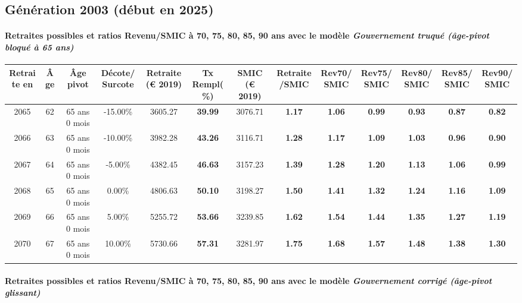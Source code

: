 \newpage 
 
\subsection{Génération 2003 (début en 2025)} 

\paragraph{Retraites possibles et ratios Revenu/SMIC à 70, 75, 80, 85, 90 ans avec le modèle \emph{Gouvernement truqué (âge-pivot bloqué à 65 ans)}}  
 
{ \scriptsize \begin{center} 
\begin{tabular}[htb]{|c|c||c|c||c|c||c||c|c|c|c|c|c|} 
\hline 
 Retraite en &  Âge &  Âge pivot &  Décote/Surcote &  Retraite (\euro{} 2019) &  Tx Rempl(\%) &  SMIC (\euro{} 2019) &  Retraite/SMIC &  Rev70/SMIC &  Rev75/SMIC &  Rev80/SMIC &  Rev85/SMIC &  Rev90/SMIC \\ 
\hline \hline 
 2065 &  62 &  65 ans 0 mois &  -15.00\% &  3605.27 &  {\bf 39.99} &  3076.71 &  {\bf 1.17} &  {\bf 1.06} &  {\bf {\color{red} 0.99}} &  {\bf {\color{red} 0.93}} &  {\bf {\color{red} 0.87}} &  {\bf {\color{red} 0.82}} \\ 
\hline 
 2066 &  63 &  65 ans 0 mois &  -10.00\% &  3982.28 &  {\bf 43.26} &  3116.71 &  {\bf 1.28} &  {\bf 1.17} &  {\bf 1.09} &  {\bf 1.03} &  {\bf {\color{red} 0.96}} &  {\bf {\color{red} 0.90}} \\ 
\hline 
 2067 &  64 &  65 ans 0 mois &  -5.00\% &  4382.45 &  {\bf 46.63} &  3157.23 &  {\bf 1.39} &  {\bf 1.28} &  {\bf 1.20} &  {\bf 1.13} &  {\bf 1.06} &  {\bf {\color{red} 0.99}} \\ 
\hline 
 2068 &  65 &  65 ans 0 mois &  0.00\% &  4806.63 &  {\bf 50.10} &  3198.27 &  {\bf 1.50} &  {\bf 1.41} &  {\bf 1.32} &  {\bf 1.24} &  {\bf 1.16} &  {\bf 1.09} \\ 
\hline 
 2069 &  66 &  65 ans 0 mois &  5.00\% &  5255.72 &  {\bf 53.66} &  3239.85 &  {\bf 1.62} &  {\bf 1.54} &  {\bf 1.44} &  {\bf 1.35} &  {\bf 1.27} &  {\bf 1.19} \\ 
\hline 
 2070 &  67 &  65 ans 0 mois &  10.00\% &  5730.66 &  {\bf 57.31} &  3281.97 &  {\bf 1.75} &  {\bf 1.68} &  {\bf 1.57} &  {\bf 1.48} &  {\bf 1.38} &  {\bf 1.30} \\ 
\hline 
\hline 
\end{tabular} 
\end{center} } 
\paragraph{Retraites possibles et ratios Revenu/SMIC à 70, 75, 80, 85, 90 ans avec le modèle \emph{Gouvernement corrigé (âge-pivot glissant)}}  
 
